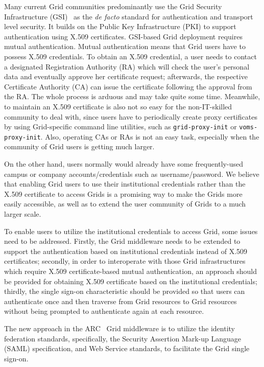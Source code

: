 \documentclass[conference]{IEEEtran}
\begin{document}
Many current Grid communities predominantly use the Grid Security Infrastructure (GSI)~\cite{IFoster98} as the \textit{de facto} 
standard for authentication and transport level security. It builds on the Public Key Infrastructure
(PKI) to support authentication using X.509 certificates. GSI-based Grid deployment requires mutual authentication.
Mutual authentication means that Grid users have to possess X.509 
credentials. To obtain an X.509 credential, a user needs to contact a designated Registration Authority (RA)
which will check the user's personal data and eventually approve her certificate request; afterwards,
the respective Certificate Authority (CA) can issue the certificate following the approval from 
the RA. The whole process is arduous and may take quite some time.
Meanwhile, to maintain an X.509 certificate is also not so easy for the non-IT-skilled community to deal 
with, since users have to periodically create proxy certificates by using Grid-specific command line 
utilities, such as \texttt{grid-proxy-init} or \texttt{voms-proxy-init}. Also, operating CAs or RAs is not an  
easy task, especially when the community of Grid users is getting much larger.

On the other hand, users normally would already have some frequently-used campus or company 
accounts/credentials such as username/password. We believe that enabling Grid users to use their institutional 
credentials rather than the X.509 certificate to access Grids is a promising way 
to make the Grids more easily accessible, as well as to extend the user community of Grids
to a much larger scale.

To enable users to utilize the institutional credentials to access Grid, some issues need to be 
addressed. Firstly, the Grid middleware needs to be extended to support the authentication based on
institutional credentials instead of X.509 certificates; secondly, in order to interoperate with
those Grid infrastructures which require X.509 certificate-based mutual authentication, an approach
should be provided for obtaining X.509 certificate based on the institutional credentials; thirdly,
the single sign-on characteristic should be provided so that users can authenticate once and then traverse 
from Grid resources to Grid resources without being prompted to authenticate again at each resource.

The new approach in the ARC~\cite{MEllert07} Grid middleware is to utilize the identity federation 
standards, specifically, the Security Assertion Mark-up Language (SAML) specification, and Web 
Service standards, to facilitate the Grid single sign-on.
\end{document}
